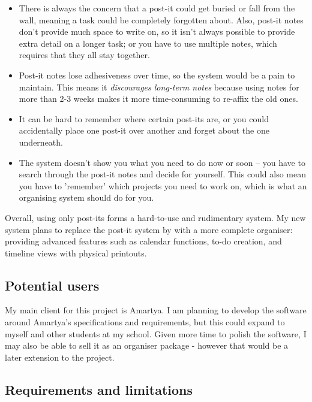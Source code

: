 \begin{itemize}
  \item There is always the concern that a post-it could get buried or fall
        from the wall, meaning a task could be completely forgotten about.
        Also, post-it notes don't provide much space to write on, so it isn't
        always possible to provide extra detail on a longer task; or you have to
        use multiple notes, which requires that they all stay together.
  \item Post-it notes lose adhesiveness over time, so the system would be a pain
        to maintain. This means it \textit{discourages long-term notes} because
        using notes for more than 2-3 weeks makes it more time-consuming to
        re-affix the old ones.
  \item It can be hard to remember where certain post-its are, or you could
        accidentally place one post-it over another and forget about the one
        underneath.
  \item The system doesn't show you what you need to do now or soon -- you have
        to search through the post-it notes and decide for yourself. This could
        also mean you have to 'remember' which projects you need to work on,
        which is what an organising system should do for you.
\end{itemize}

Overall, using only post-its forms a hard-to-use and rudimentary system. My new
system plans to replace the post-it system by with a more complete organiser:
providing advanced features such as calendar functions, to-do creation, and
timeline views with physical printouts.


\subsection{Potential users}

My main client for this project is Amartya. I am planning to develop the
software around Amartya's specifications and requirements, but this could
expand to myself and other students at my school. Given more time to polish the
software, I may also be able to sell it as an organiser package - however that
would be a later extension to the project.


\subsection{Requirements and limitations}

